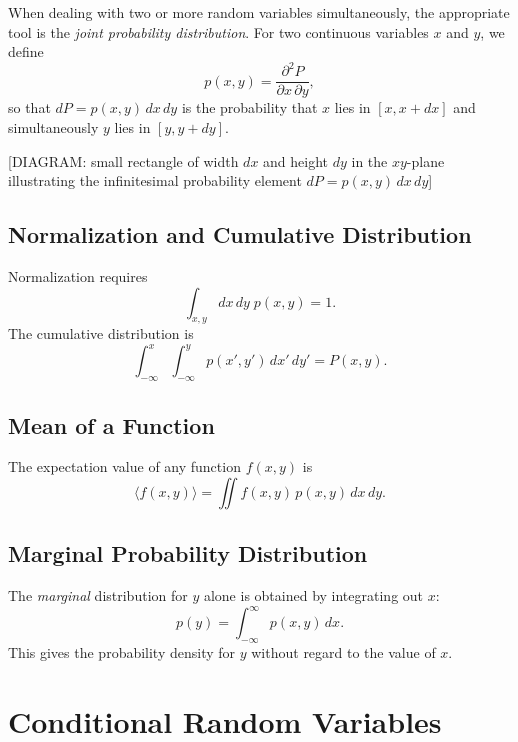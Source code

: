 When dealing with two or more random variables simultaneously, the appropriate tool is the \emph{joint probability distribution}. For two continuous variables $x$ and $y$, we define
\begin{equation}
    p(x,y) = \frac{\partial^2 P}{\partial x\,\partial y},
\end{equation}
so that $dP = p(x,y)\,dx\,dy$ is the probability that $x$ lies in $[x, x+dx]$ and simultaneously $y$ lies in $[y, y+dy]$.

\begin{center}[DIAGRAM: small rectangle of width $dx$ and height $dy$ in the $xy$-plane illustrating the infinitesimal probability element $dP = p(x,y)\,dx\,dy$]\end{center}

\subsection{Normalization and Cumulative Distribution}

Normalization requires
\begin{equation}
    \int_{x,y} dx\,dy\;p(x,y) = 1.
\end{equation}
The cumulative distribution is
\begin{equation}
    \int_{-\infty}^{x}\int_{-\infty}^{y} p(x',y')\,dx'\,dy' = P(x,y).
\end{equation}

\subsection{Mean of a Function}

The expectation value of any function $f(x,y)$ is
\begin{equation}
    \langle f(x,y) \rangle = \iint f(x,y)\,p(x,y)\,dx\,dy.
\end{equation}

\subsection{Marginal Probability Distribution}

The \emph{marginal} distribution for $y$ alone is obtained by integrating out $x$:
\begin{equation}
    p(y) = \int_{-\infty}^{\infty} p(x,y)\,dx.
\end{equation}
This gives the probability density for $y$ without regard to the value of $x$.

\section{Conditional Random Variables}

